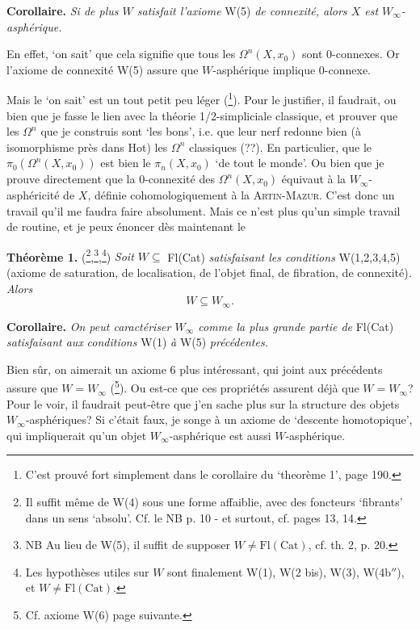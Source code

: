\documentclass[11pt]{article}
\newcommand{\msp}[1]{\marginpar{\footnotesize [#1]}}
\begin{document}
\textbf{Corollaire.} \textit{Si de plus $W$ satisfait l'axiome} W(5) \textit{de connexité, alors $X$ est $W_\infty$-asphérique.}

En effet, `on sait' que cela signifie que tous les $\Omega^n(X, x_0)$ sont 0-connexes. Or l'axiome de connexité W(5) assure que $W$-asphérique implique 0-connexe.

Mais le `on sait' est un tout petit peu léger (\footnote[25]{C'est prouvé fort simplement dans le corollaire du `theorème 1', page 190.}). Pour le justifier, il faudrait, ou bien %
que je fasse le lien avec la théorie 1/2-simpliciale classique, et prouver que les $\Omega^n$ que je construis sont `les bons', i.e. que leur nerf redonne bien (à isomorphisme près dans Hot) les $\Omega^n$ classiques (??). En particulier, que le $\pi_0(\Omega^n(X, x_0))$ est bien le $\pi_n(X, x_0)$ `de tout le monde'. Ou bien que je prouve directement que la 0-connexité des $\Omega^n(X, x_0)$ équivaut à la $W_\infty$-asphéricité de $X$, définie cohomologiquement à la \textsc{Artin-Mazur}. C'est donc un travail qu'il me faudra faire absolument. Mais ce n'est plus qu'un simple travail de routine, et je peux énoncer dès maintenant le

\textbf{Théorème 1.} (\footnote[26]{Il suffit même de W(4) sous une forme affaiblie, avec des foncteurs `fibrants' dans un sens `absolu'. Cf. le NB p. 10 - et surtout, cf. pages 13, 14.},\footnote[27]{NB Au lieu de W(5), il suffit de supposer $W \neq \mathrm{Fl}(\mathrm{Cat})$, cf. th. 2, p. 20.},\footnote[28]{Les hypothèses utiles sur $W$ sont finalement W(1), W(2 bis), W(3), W(4b$''$), et $W \neq \mathrm{Fl}(\mathrm{Cat})$.}) \textit{Soit $W \subseteq$} Fl(Cat) \textit{satisfaisant les conditions} W(1,2,3,4,5) (axiome de saturation, de localisation, de l'objet final, de fibration, de connexité)\textit{. Alors}
\[ W \subseteq W_\infty . \]

\textbf{Corollaire.} \textit{On peut caractériser $W_\infty$ comme la plus grande partie de} Fl(Cat) \textit{satisfaisant aux}
\msp{page 13}\textit{conditions} W(1) \textit{à} W(5) \textit{précédentes.}

Bien sûr, on aimerait un axiome 6 plus intéressant, qui joint aux précédents assure que $W = W_\infty$ (\footnote[29]{Cf. axiome W(6) page suivante.}). Ou est-ce que ces propriétés assurent déjà que $W = W_\infty$? Pour le voir, il faudrait peut-être que j'en sache plus sur la structure des objets $W_\infty$-asphériques? Si c'était faux, je songe à un axiome de `descente homotopique', qui impliquerait qu'un objet $W_\infty$-asphérique est aussi $W$-asphérique.
\end{document}
